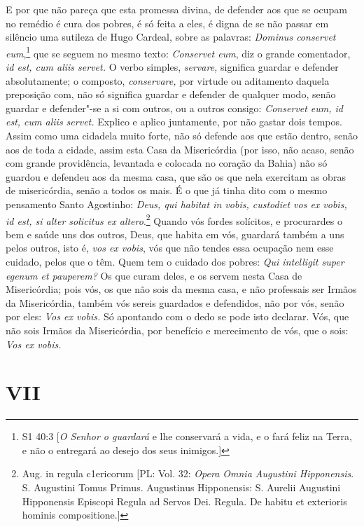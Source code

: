 E por que não pareça que esta promessa divina, de defender aos que se
ocupam no remédio é cura dos pobres, é só feita a eles, é digna de se
não passar em silêncio uma sutileza de Hugo Cardeal, sobre as palavras:
\emph{Dominus conservet eum},\footnote{S1 40:3 [\textit{O Senhor o guardará} e lhe conservará a vida, e o fará feliz na Terra, e não o entregará ao desejo dos seus inimigos.]} que se seguem no mesmo texto:
\emph{Conservet eum}, diz o grande comentador, \emph{id est, cum aliis
servet.} O verbo simples, \emph{servare,} significa guardar e defender
absolutamente; o composto, \emph{conservare,} por virtude ou aditamento
daquela preposição com, não só significa guardar e defender de qualquer
modo, senão guardar e defender"-se a si com outros, ou a outros consigo:
\emph{Conservet eum, id est, cum aliis servet.} Explico e aplico
juntamente, por não gastar dois tempos. Assim como uma cidadela muito
forte, não só defende aos que estão dentro, senão aos de toda a cidade,
assim esta Casa da Misericórdia (por isso, não acaso, senão com grande
providência, levantada e colocada no coração da Bahia) não só guardou e
defendeu aos da mesma casa, que são os que nela exercitam as obras de
misericórdia, senão a todos os mais. É o que já tinha dito com o mesmo
pensamento Santo Agostinho: \emph{Deus, qui habitat in vobis, custodiet
vos ex vobis, id est, si alter solicitus ex altero}.\footnote{Aug. in regula c1ericorum [PL: Vol. 32: \textit{Opera Omnia Augustini Hipponensis}. S. Augustini Tomus Primus. Augustinus Hipponensis: S. Aurelii Augustini Hipponensis Episcopi Regula ad Servos Dei. Regula. De habitu et exterioris hominis compositione.]} Quando vós
fordes solícitos, e procurardes o bem e saúde uns dos outros, Deus, que
habita em vós, guardará também a uns pelos outros, isto é, \emph{vos ex
vobis}, vós que não tendes essa ocupação nem esse cuidado, pelos que o
têm.
Quem tem o cuidado dos pobres: \emph{Qui intelligit super egenum et
pauperem?} Os que curam deles, e os servem nesta Casa de Misericórdia; pois vós, os
que não sois da mesma casa, e não professais ser Irmãos da Misericórdia,
também vós sereis guardados e defendidos, não por vós, senão por eles:
\emph{Vos ex vobis.} Só apontando com o dedo se pode isto declarar.
Vós, que não sois Irmãos da Misericórdia, por benefício e merecimento de
vós, que o sois: \emph{Vos ex vobis.}

\section{VII}

